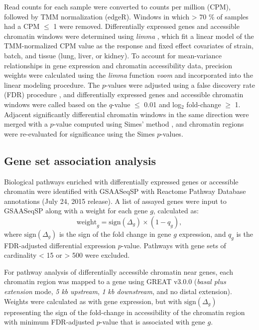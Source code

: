 \documentclass[9pt,twocolumn,twoside]{gsajnl}
\newcommand{\WV}[2]{\textcolor{red}{#1\footnote{\textcolor{red}{WV: #2}}}}
\newcommand{\GK}[2]{\textcolor{teal}{#1\footnote{\textcolor{teal}{GK: #2}}}}
\newcommand{\GKinline}[1]{\textcolor{teal}{#1}}
\newcommand{\GKst}[1]{\textcolor{teal}{\st{#1}}}
\begin{document}
Read counts for each sample were converted to counts per million (CPM), followed by TMM normalization (edgeR). Windows in which > 70 \% of samples had a CPM $\leq$ 1 were removed. Differentially expressed genes and accessible chromatin windows were determined using \textit{limma} \citep{limma}, which fit a linear model of the TMM-normalized CPM value as the response and fixed effect covariates of strain, batch, and tissue (lung, liver, or kidney). 
To account for mean-variance relationships in gene expression and chromatin accessibility data, precision weights were calculated using the \textit{limma} function \textit{voom} and incorporated into the linear modeling procedure. The $p$-values were adjusted using a false discovery rate (FDR) procedure \citep{Benjamini1995}, and differentially expressed genes and accessible chromatin windows were called based on the $q$-value $\le$ 0.01 and log$_{2}$ fold-change $\geq$ 1. Adjacent significantly differential chromatin windows in the same direction were merged with a $p$-value computed using Simes' method \citep{Sarkar1997}, and chromatin regions were re-evaluated for significance using the Simes $p$-values.

\subsection{Gene set association analysis}

Biological pathways enriched with differentially expressed genes or accessible chromatin were identified with GSAASeqSP \citep{Xiong2014} with Reactome Pathway Database annotations (July 24, 2015 release). A list of assayed genes were input to GSAASeqSP along with a weight for each gene $g$, calculated as:
\begin{equation}
\text{weight}_{g} = \text{sign}(\Delta_{g}) \times (1-q_{g}),
\label{eq:gene_weighting}
\end{equation}
where $\text{sign}(\Delta_{g})$ is the sign of the fold change in gene $g$ expression, and $q_{g}$ is the FDR-adjusted differential expression $p$-value. Pathways with gene sets of cardinality < 15 or > 500 were excluded. 

For pathway analysis of differentially accessible chromatin near genes, each chromatin region was mapped to a gene using GREAT v3.0.0 (\textit{basal plus extension} mode, \textit{5 kb upstream}, \textit{1 kb downstream}, and no distal extension). 
Weights were calculated as with gene expression, but with $\text{sign}(\Delta_{g})$ representing the sign of the fold-change in accessibility of the chromatin region with minimum FDR-adjusted $p$-value that is associated with gene $g$.
\end{document}

